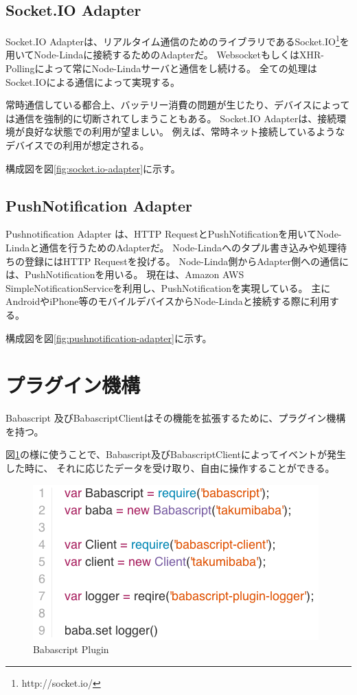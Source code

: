 \subsection{Socket.IO Adapter}\label{socket.io-adapter}

Socket.IO
Adapterは、リアルタイム通信のためのライブラリであるSocket.IO\footnote{http://socket.io/}を用いてNode-Lindaに接続するためのAdapterだ。
WebsocketもしくはXHR-Pollingによって常にNode-Lindaサーバと通信をし続ける。
全ての処理はSocket.IOによる通信によって実現する。

常時通信している都合上、バッテリー消費の問題が生じたり、デバイスによっては通信を強制的に切断されてしまうこともある。
Socket.IO Adapterは、接続環境が良好な状態での利用が望ましい。
例えば、常時ネット接続しているようなデバイスでの利用が想定される。

構成図を図\ref{fig:socket.io-adapter}に示す。

\subsection{PushNotification Adapter}\label{pushnotification-adapter}

Pushnotification Adapter は、HTTP
RequestとPushNotificationを用いてNode-Lindaと通信を行うためのAdapterだ。
Node-Lindaへのタプル書き込みや処理待ちの登録にはHTTP Requestを投げる。
Node-Linda側からAdapter側への通信には、PushNotificationを用いる。
現在は、Amazon AWS
SimpleNotificationServiceを利用し、PushNotificationを実現している。
主にAndroidやiPhone等のモバイルデバイスからNode-Lindaと接続する際に利用する。

構成図を図\ref{fig:pushnotification-adapter}に示す。

\section{プラグイン機構}\label{ux30d7ux30e9ux30b0ux30a4ux30f3ux6a5fux69cb}

Babascript
及びBabascriptClientはその機能を拡張するために、プラグイン機構を持つ。

図\ref{fig:babascript_plugin}の様に使うことで、Babascript及びBabascriptClientによってイベントが発生した時に、
それに応じたデータを受け取り、自由に操作することができる。

\begin{figure}[htbp]
  \begin{center}
  \includegraphics[width=.7\linewidth,bb=0 0 416 226]{images/babascript_plugin.js.png}
  \end{center}
  \caption{Babascript Plugin}
  \label{fig:babascript_plugin}
\end{figure}

